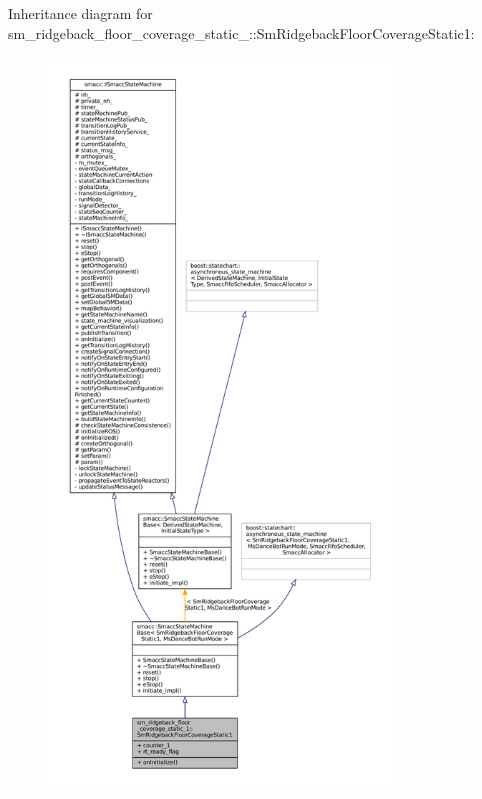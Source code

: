 Inheritance diagram for sm\+\_\+ridgeback\+\_\+floor\+\_\+coverage\+\_\+static\+\_\+:\+:Sm\+Ridgeback\+Floor\+Coverage\+Static1\+:
\nopagebreak
\begin{figure}[H]
\begin{center}
\leavevmode
\includegraphics[height=550pt]{structsm__ridgeback__floor__coverage__static__1_1_1SmRidgebackFloorCoverageStatic1__inherit__graph}
\end{center}
\end{figure}


